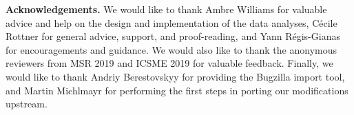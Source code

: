 \documentclass[conference]{IEEEtran}
\begin{document}
\noindent\footnotesize{\textbf{Acknowledgements.}}
We would like to thank Ambre Williams for valuable advice and help on the design and implementation of the data analyses, C\'ecile Rottner for general advice, support, and proof-reading, and Yann R\'egis-Gianas for encouragements and guidance.
We would also like to thank the anonymous reviewers from MSR 2019 and ICSME 2019 for valuable feedback.
Finally, we would like to thank Andriy Berestovskyy for providing the Bugzilla import tool, and Martin Michlmayr for performing the first steps in porting our modifications upstream.
%
\balance


%
\end{document}
